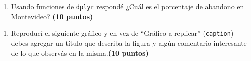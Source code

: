 \documentclass[
]{article}
\newenvironment{Shaded}{\begin{snugshade}}{\end{snugshade}}
\newcommand{\DataTypeTok}[1]{\textcolor[rgb]{0.13,0.29,0.53}{#1}}
\newcommand{\DecValTok}[1]{\textcolor[rgb]{0.00,0.00,0.81}{#1}}
\newcommand{\KeywordTok}[1]{\textcolor[rgb]{0.13,0.29,0.53}{\textbf{#1}}}
\newcommand{\NormalTok}[1]{#1}
\newcommand{\OperatorTok}[1]{\textcolor[rgb]{0.81,0.36,0.00}{\textbf{#1}}}
\newcommand{\StringTok}[1]{\textcolor[rgb]{0.31,0.60,0.02}{#1}}
\providecommand{\tightlist}{%
  \setlength{\itemsep}{0pt}\setlength{\parskip}{0pt}}
\begin{document}
\begin{enumerate}
\def\labelenumi{\arabic{enumi}.}
\setcounter{enumi}{2}
\tightlist
\item
  Usando funciones de \texttt{dplyr} respondé ¿Cuál es el porcentaje de
  abandono en Montevideo? \textbf{(10 puntos)}
\end{enumerate}

\begin{Shaded}
\end{Shaded}

\begin{enumerate}
\def\labelenumi{\arabic{enumi}.}
\setcounter{enumi}{3}
\tightlist
\item
  Reproducí el siguiente gráfico y en vez de ``Gráfico a replicar''
  (\texttt{caption}) debes agregar un título que describa la figura y
  algún comentario interesante de lo que observás en la
  misma.\textbf{(10 puntos) }
\end{enumerate}

\begin{Shaded}
\end{Shaded}
\end{document}
